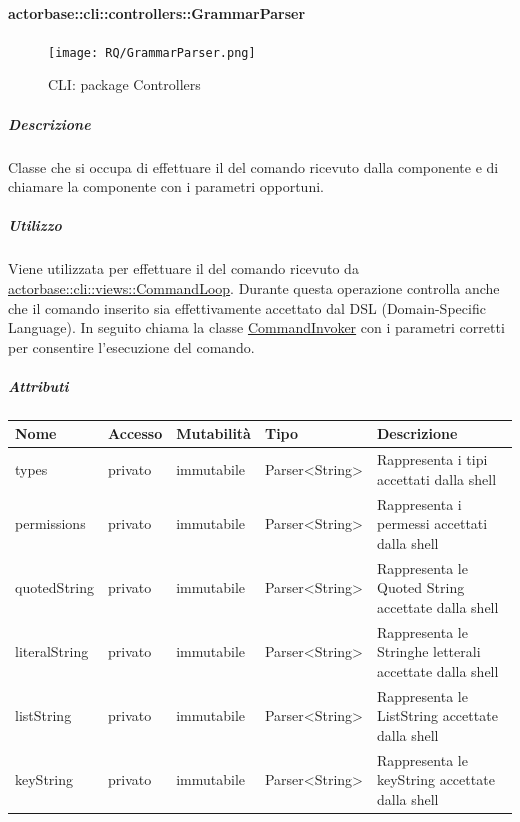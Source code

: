 \documentclass{scalatekids-article}
\begin{document}
\paragraph{actorbase::cli::controllers::GrammarParser}
\label{sec:actorbase::cli::controllers::GrammarParser}

\begin{figure}[H]
  \begin{center}
    \texttt{[image: RQ/GrammarParser.png]}
    \caption{CLI: package Controllers}
  \end{center}
\end{figure}

\subparagraph{Descrizione}

Classe che si occupa di effettuare il  del comando ricevuto
dalla componente  e di chiamare la componente  con i
parametri opportuni.

\subparagraph{Utilizzo}

Viene utilizzata per effettuare il  del comando ricevuto da
\hyperref[sec:actorbase::cli::views::CommandLoop]{actorbase::cli::views::CommandLoop}.
Durante questa operazione controlla anche che il comando inserito sia
effettivamente accettato dal DSL (Domain-Specific Language). In seguito chiama
la classe \hyperref[sec:actorbase::cli::models::CommandInvoker]{CommandInvoker}
con i parametri corretti per consentire l'esecuzione del comando.

\subparagraph{Attributi}

\begin{tabular}{| p{2.5cm} | p{1.5cm} | p{2cm} | p{2.5cm} | p{8.5cm} |}
  \hline
  Nome & Accesso & Mutabilità & Tipo & Descrizione\\
  \hline
  types & privato & immutabile & Parser<String> & Rappresenta i tipi accettati dalla shell\\
  \hline
  permissions & privato & immutabile & Parser<String> & Rappresenta i permessi accettati dalla shell\\
  \hline
  quotedString & privato & immutabile & Parser<String> & Rappresenta le Quoted String accettate dalla shell\\
  \hline
  literalString & privato & immutabile & Parser<String> & Rappresenta le Stringhe letterali accettate dalla shell\\
  \hline
  listString & privato & immutabile & Parser<String> & Rappresenta le ListString accettate dalla shell\\
  \hline
  keyString & privato & immutabile & Parser<String> & Rappresenta le keyString accettate dalla shell\\
  \hline
\end{tabular}
\end{document}
